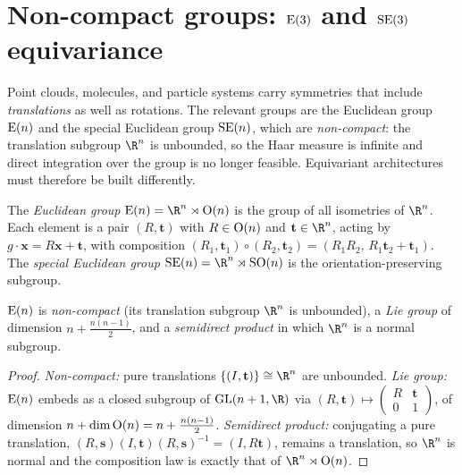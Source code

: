 \section{Non-compact groups: $\operatorname{E}(3)$ and $\operatorname{SE}(3)$ equivariance}
\label{sec:groups:noncompact}

Point clouds, molecules, and particle systems carry symmetries that include
\emph{translations} as well as rotations. The relevant groups are the Euclidean
group $\operatorname{E}(n)$ and the special Euclidean group $\operatorname{SE}(n)$, which are
\emph{non-compact}: the translation subgroup $\R^n$ is unbounded, so the Haar
measure is infinite and direct integration over the group is no longer feasible.
Equivariant architectures must therefore be built differently.

\begin{definition}
\label{def:groups:euclidean}
The \emph{Euclidean group} $\Eucl(n) = \R^n \rtimes \OO(n)$ is the group of all
isometries of $\R^n$. Each element is a pair $(R, \mathbf{t})$ with $R \in
\operatorname{O}(n)$ and $\mathbf{t} \in \R^n$, acting by $g \cdot \mathbf{x} = R\mathbf{x} +
\mathbf{t}$, with composition $(R_1, \mathbf{t}_1)\circ(R_2, \mathbf{t}_2) =
(R_1 R_2,\, R_1 \mathbf{t}_2 + \mathbf{t}_1)$. The \emph{special Euclidean group}
$\SE(n) = \R^n \rtimes \SO(n)$ is the orientation-preserving subgroup.
\end{definition}

\begin{proposition}
\label{prop:groups:en-properties}
$\operatorname{E}(n)$ is \emph{non-compact} (its translation subgroup $\R^n$ is unbounded),
a \emph{Lie group} of dimension $n + \tfrac{n(n-1)}{2}$, and a \emph{semidirect
product} in which $\R^n$ is a normal subgroup.
\end{proposition}

\begin{proof}
\emph{Non-compact:} pure translations $\{(I, \mathbf{t})\} \cong \R^n$ are
unbounded. \emph{Lie group:} $\operatorname{E}(n)$ embeds as a closed subgroup of
$\GL(n+1, \R)$ via $(R, \mathbf{t}) \mapsto \left(\begin{smallmatrix} R &
\mathbf{t} \\ 0 & 1 \end{smallmatrix}\right)$, of dimension $n + \dim \operatorname{O}(n) = n
+ \tfrac{n(n-1)}{2}$. \emph{Semidirect product:} conjugating a pure translation,
$(R, \mathbf{s})(I, \mathbf{t})(R, \mathbf{s})^{-1} = (I, R\mathbf{t})$, remains
a translation, so $\R^n$ is normal and the composition law is exactly that of
$\R^n \rtimes \OO(n)$.
\end{proof}

